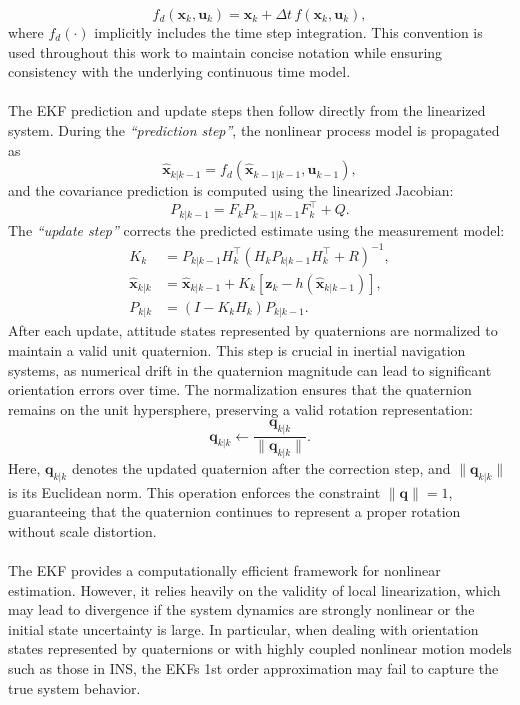 $$
    f_d(\mathbf{x}_k, \mathbf{u}_k) = \mathbf{x}_k + \Delta t \, f(\mathbf{x}_k, \mathbf{u}_k),
$$
where $f_d(\cdot)$ implicitly includes the time step integration. This convention is used throughout this work to maintain concise notation while ensuring consistency with the underlying continuous time model.
\\ \\
The EKF prediction and update steps then follow directly from the linearized system. During the \textit{``prediction step''}, the nonlinear process model is propagated as
$$
    \hat{\mathbf{x}}_{k|k-1} = f_d(\hat{\mathbf{x}}_{k-1|k-1}, \mathbf{u}_{k-1}),
$$
and the covariance prediction is computed using the linearized Jacobian:
$$
    P_{k|k-1} = F_k P_{k-1|k-1} F_k^\top + Q.
$$
The \textit{``update step''} corrects the predicted estimate using the measurement model:
$$
\begin{aligned}
    K_k &= P_{k|k-1}H_k^\top(H_kP_{k|k-1}H_k^\top + R)^{-1}, \\
    \hat{\mathbf{x}}_{k|k} &= \hat{\mathbf{x}}_{k|k-1} + K_k[\mathbf{z}_k - h(\hat{\mathbf{x}}_{k|k-1})], \\
    P_{k|k} &= (I - K_kH_k)P_{k|k-1}.
\end{aligned}
$$
After each update, attitude states represented by quaternions are normalized to maintain a valid unit quaternion. This step is crucial in inertial navigation systems, as numerical drift in the quaternion magnitude can lead to significant orientation errors over time. The normalization ensures that the quaternion remains on the unit hypersphere, preserving a valid rotation representation:
$$
    \mathbf{q}_{k|k} \leftarrow \frac{\mathbf{q}_{k|k}}{\|\mathbf{q}_{k|k}\|}.
$$
Here, $\mathbf{q}_{k|k}$ denotes the updated quaternion after the correction step, and $\|\mathbf{q}_{k|k}\|$ is its Euclidean norm. This operation enforces the constraint $\|\mathbf{q}\| = 1$, guaranteeing that the quaternion continues to represent a proper rotation without scale distortion.
\\ \\
The EKF provides a computationally efficient framework for nonlinear estimation. However, it relies heavily on the validity of local linearization, which may lead to divergence if the system dynamics are strongly nonlinear or the initial state uncertainty is large. In particular, when dealing with orientation states represented by quaternions or with highly coupled nonlinear motion models such as those in INS, the EKFs 1st order approximation may fail to capture the true system behavior.  
